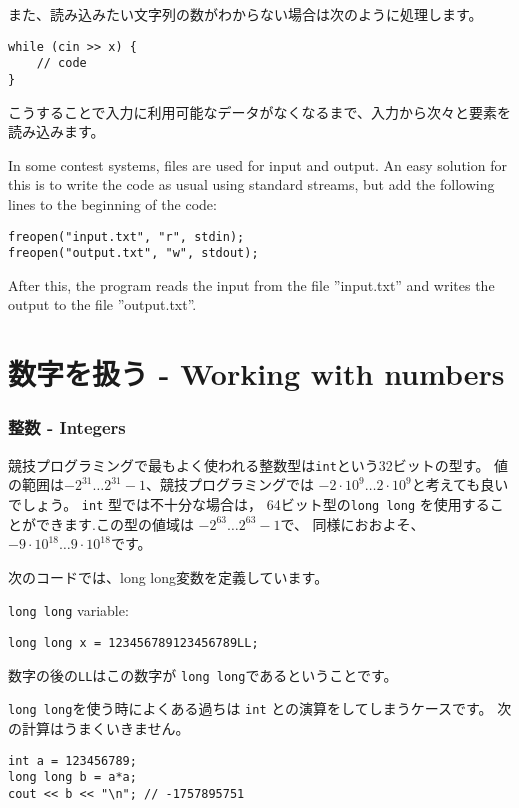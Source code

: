 また、読み込みたい文字列の数がわからない場合は次のように処理します。
\begin{lstlisting}
while (cin >> x) {
    // code
}
\end{lstlisting}
こうすることで入力に利用可能なデータがなくなるまで、入力から次々と要素を読み込みます。

In some contest systems, files are used for
input and output.
An easy solution for this is to write
the code as usual using standard streams,
but add the following lines to the beginning of the code:
\begin{lstlisting}
freopen("input.txt", "r", stdin);
freopen("output.txt", "w", stdout);
\end{lstlisting}
After this, the program reads the input from the file
''input.txt'' and writes the output to the file
''output.txt''.

\section{数字を扱う - Working with numbers}


\subsubsection{整数 - Integers}

競技プログラミングで最もよく使われる整数型は\texttt{int}という32ビットの型す。
値の範囲は$-2^{31} \ldots 2^{31}-1$、競技プログラミングでは
$-2 \cdot 10^9 \ldots 2 \cdot 10^9$と考えても良いでしょう。
\texttt{int} 型では不十分な場合は， 64ビット型の\texttt{long long}
を使用することができます.この型の値域は
$-2^{63} \ldots 2^{63}-1$で、
同様におおよそ、$-9 \cdot 10^{18} \ldots 9 \cdot 10^{18}$です。

次のコードでは、long long変数を定義しています。

\texttt{long long} variable:
\begin{lstlisting}
long long x = 123456789123456789LL;
\end{lstlisting}
数字の後の\texttt{LL}はこの数字が
\texttt{long long}であるということです。

\texttt{long long}を使う時によくある過ちは
\texttt{int} との演算をしてしまうケースです。
次の計算はうまくいきません。

\begin{lstlisting}
int a = 123456789;
long long b = a*a;
cout << b << "\n"; // -1757895751
\end{lstlisting}

